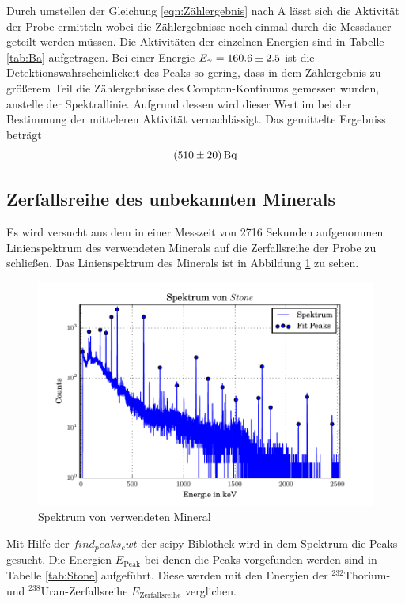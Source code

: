Durch umstellen der Gleichung \ref{eqn:Zählergebnis} nach A lässt sich die Aktivität der Probe ermitteln wobei die Zählergebnisse noch einmal durch die Messdauer geteilt werden müssen. Die Aktivitäten der einzelnen Energien sind in Tabelle \ref{tab:Ba} aufgetragen. Bei einer Energie $E_\gamma = \num{160.6 +- 2.5}$ ist die Detektionswahrscheinlickeit des Peaks so gering, dass in dem  Zählergebnis zu größerem Teil die Zählergebnisse des Compton-Kontinums gemessen wurden, anstelle der Spektrallinie. Aufgrund dessen wird dieser Wert im bei der Bestimmung der mitteleren Aktivität vernachlässigt. Das gemittelte Ergebniss beträgt
\begin{equation}
  (\num{510 +- 20}) \, \text{Bq}
  \label{eqn:aktBq}
\end{equation}
\subsection{Zerfallsreihe des unbekannten Minerals}
Es wird versucht aus dem in einer Messzeit von 2716 Sekunden aufgenommen Linienspektrum des verwendeten Minerals auf die Zerfallsreihe der Probe zu schließen. Das Linienspektrum des Minerals ist in Abbildung \ref{fig:Stone} zu sehen.
\begin{figure}[h]
  \centering
  \includegraphics[width=\textwidth]{./build/SpektSt.pdf}
  \caption{Spektrum von verwendeten Mineral}
  \label{fig:Stone}
\end{figure}
Mit Hilfe der $find_peaks_cwt$ der scipy Biblothek wird in dem Spektrum die Peaks gesucht. Die Energien $E_\text{Peak}$ bei denen die Peaks vorgefunden werden sind in Tabelle \ref{tab:Stone} aufgeführt. Diese werden mit den Energien der $^{232}$Thorium- und $^{238}$Uran-Zerfallsreihe $E_\text{Zerfallsreihe}$ verglichen. 
